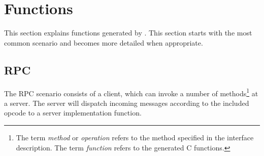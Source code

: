 \section{Functions}
\label{sec:functions}

This section explains functions generated by \dice{}.  This section starts
with the most common scenario and becomes more detailed when appropriate.

\subsection{RPC} 

The RPC scenario consists of a client, which can invoke a number of
methods\footnote{The term \emph{method} or \emph{operation} refers to the
method specified in the interface description. The term \emph{function} refers
to the generated C functions.} at a server.  The server will dispatch incoming
messages according to the included opcode to a server implementation function.

